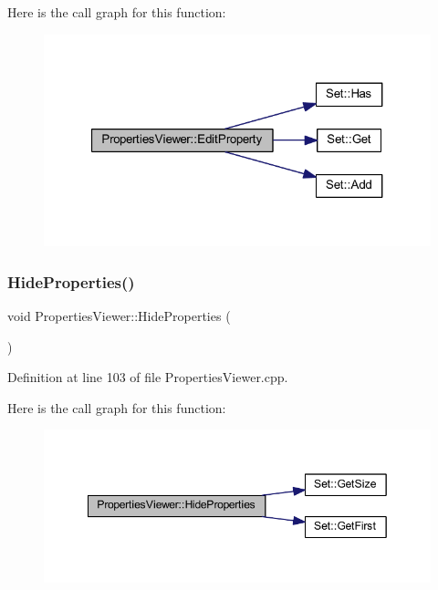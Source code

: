 Here is the call graph for this function\+:
\nopagebreak
\begin{figure}[H]
\begin{center}
\leavevmode
\includegraphics[width=321pt]{class_properties_viewer_ac726c244cf706ab9de1b2c3c6e55af2d_cgraph}
\end{center}
\end{figure}
\mbox{\label{class_properties_viewer_aa8b18eb764e97888751e5c5ef0bd207f}} 
\subsubsection{\texorpdfstring{Hide\+Properties()}{HideProperties()}}
{\footnotesize\ttfamily void Properties\+Viewer\+::\+Hide\+Properties (\begin{DoxyParamCaption}{ }\end{DoxyParamCaption})}



Definition at line 103 of file Properties\+Viewer.\+cpp.

Here is the call graph for this function\+:
\nopagebreak
\begin{figure}[H]
\begin{center}
\leavevmode
\includegraphics[width=349pt]{class_properties_viewer_aa8b18eb764e97888751e5c5ef0bd207f_cgraph}
\end{center}
\end{figure}
\mbox{\label{class_properties_viewer_aac1a5924495246147e465375a686d938}} 
